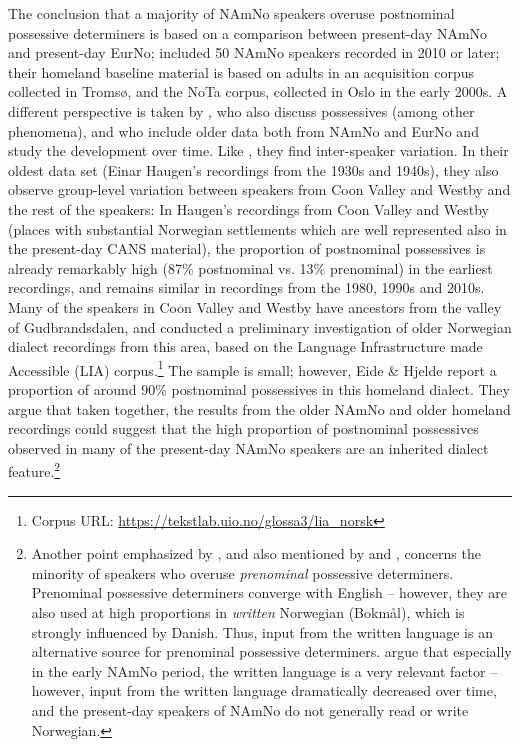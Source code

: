 \documentclass[output=paper,colorlinks,citecolor=brown]{langscibook}
\begin{document}
The conclusion that a majority of NAmNo speakers overuse postnominal possessive determiners is based on a comparison between present-day NAmNo and present-day EurNo; \citet{anderssenetal2018cross-linguistic} included 50 NAmNo speakers recorded in 2010 or later; their homeland baseline material is based on adults in an acquisition corpus collected in Tromsø, and the NoTa corpus, collected in Oslo in the early 2000s. A different perspective is taken by \citet{eidehjelde2023input}, who also discuss possessives (among other phenomena), and who include older data both from NAmNo and EurNo and study the development over time. Like \citet{anderssenetal2018cross-linguistic}, they find  inter-speaker variation. In their oldest data set (Einar Haugen's recordings from the 1930s and 1940s), they also observe group-level variation between speakers from Coon Valley and Westby and the rest of the speakers: In Haugen's recordings from Coon Valley and Westby (places with substantial Norwegian settlements which are well represented also in the present-day CANS material), the proportion of postnominal possessives is already remarkably high (87\% postnominal vs. 13\% prenominal) in the earliest recordings, and remains similar in recordings from the 1980, 1990s and 2010s. Many of the speakers in Coon Valley and Westby have ancestors from the valley of Gudbrandsdalen, and \citet{eidehjelde2023input} conducted a preliminary investigation of older Norwegian dialect recordings from this area, based on the Language Infrastructure made Accessible (LIA) corpus.\footnote{Corpus URL: \url{https://tekstlab.uio.no/glossa3/lia\_norsk}}  The sample is small; however, Eide \& Hjelde report a proportion of around 90\% postnominal possessives in this homeland dialect. They argue that taken together,  the results from the older NAmNo and older homeland recordings could suggest that the high proportion of postnominal possessives observed in many of the present-day NAmNo speakers are an inherited dialect feature.\footnote{Another point emphasized by \citet{eidehjelde2023input}, and also mentioned by \citet{anderssenwestergaard2012tospraklighet} and \citet{westergaardanderssen2015word}, concerns the minority of speakers who overuse \emph{prenominal} possessive determiners. Prenominal possessive determiners converge with English -- however, they are also used at high proportions in \emph{written} Norwegian (Bokmål), which is strongly influenced by Danish. 
Thus, input from the written language is an alternative source for prenominal possessive determiners. \citet{eidehjelde2023input} argue that especially in the early NAmNo period, the written language is a very relevant factor -- however, input from the written language dramatically decreased over time, and the present-day speakers of NAmNo do not generally read or write Norwegian.}
\end{document}
